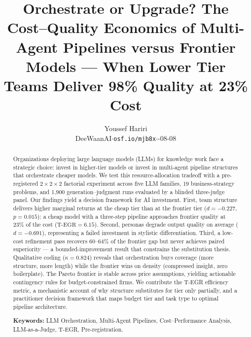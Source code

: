 \documentclass[12pt,a4paper]{article}
\title{\textbf{Orchestrate or Upgrade? The Cost--Quality Economics of
Multi-Agent Pipelines versus Frontier Models --- When Lower Tier Teams
Deliver 98\% Quality at 23\% Cost}}
\author{Youssef Hariri\\
\small DeeWaanAI\quad $\cdot$\quad \texttt{osf.io/mjb8x}\quad $\cdot$\quad 2026-08-08}
\date{}
\newcommand{\TEGR}{\ensuremath{\text{T-EGR}}}
\begin{document}
\maketitle

\begin{abstract}
\noindent
Organizations deploying large language models (LLMs) for knowledge work face a
strategic choice: invest in higher-tier models or invest in multi-agent pipeline
structures that orchestrate cheaper models. We test this resource-allocation
tradeoff with a pre-registered $2 \times 2 \times 2$ factorial experiment across
five LLM families, 19 business-strategy problems, and 1{,}900
generation--judgment runs evaluated by a blinded three-judge panel. Our findings
yield a decision framework for AI investment. First, team structure delivers
higher marginal returns at the cheap tier than at the frontier tier
($d = -0.227$, $p = 0.015$): a cheap model with a three-step pipeline
approaches frontier quality at 23\% of the cost ($\TEGR = 6.15$). Second,
personas degrade output quality on average ($d = -0.691$), representing a
failed investment in stylistic differentiation. Third, a low-cost refinement
pass recovers 60--64\% of the frontier gap but never achieves paired
superiority --- a bounded-improvement result that constrains the substitution
thesis. Qualitative coding ($\kappa = 0.824$) reveals that orchestration buys
coverage (more structure, more length) while the frontier wins on density
(compressed insight, zero boilerplate). The Pareto frontier is stable across
price assumptions, yielding actionable contingency rules for budget-constrained
firms. We contribute the T-EGR efficiency metric, a mechanistic account of why
structure substitutes for tier only partially, and a practitioner decision
framework that maps budget tier and task type to optimal pipeline architecture.

\medskip
\noindent\textbf{Keywords:} LLM Orchestration, Multi-Agent Pipelines,
Cost--Performance Analysis, LLM-as-a-Judge, T-EGR, Pre-registration.
\end{abstract}

\bigskip
\end{document}
